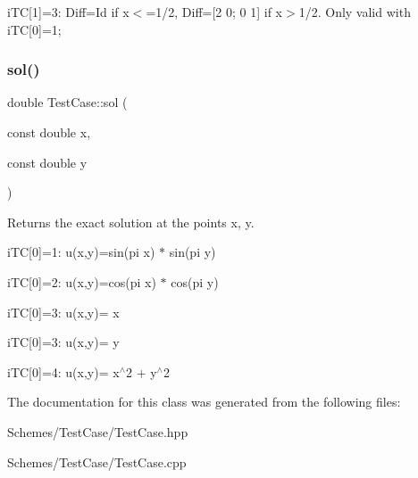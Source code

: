 i\+TC\mbox{[}1\mbox{]}=3\+: Diff=Id if x$<$=1/2, Diff=\mbox{[}2 0; 0 1\mbox{]} if x$>$1/2. Only valid with i\+TC\mbox{[}0\mbox{]}=1; \mbox{\label{classTestCase_aede719dac81c460c713d930a379c537e}} 
\subsubsection{\texorpdfstring{sol()}{sol()}}
{\footnotesize\ttfamily double Test\+Case\+::sol (\begin{DoxyParamCaption}\item[{const double}]{x,  }\item[{const double}]{y }\end{DoxyParamCaption})}



Returns the exact solution at the points x, y. 

i\+TC\mbox{[}0\mbox{]}=1\+: u(x,y)=sin(pi x) $\ast$ sin(pi y)

i\+TC\mbox{[}0\mbox{]}=2\+: u(x,y)=cos(pi x) $\ast$ cos(pi y)

i\+TC\mbox{[}0\mbox{]}=3\+: u(x,y)= x

i\+TC\mbox{[}0\mbox{]}=3\+: u(x,y)= y

i\+TC\mbox{[}0\mbox{]}=4\+: u(x,y)= x$^\wedge$2 + y$^\wedge$2 

The documentation for this class was generated from the following files\+:\begin{DoxyCompactItemize}
\item 
Schemes/\+Test\+Case/Test\+Case.\+hpp\item 
Schemes/\+Test\+Case/Test\+Case.\+cpp\end{DoxyCompactItemize}
